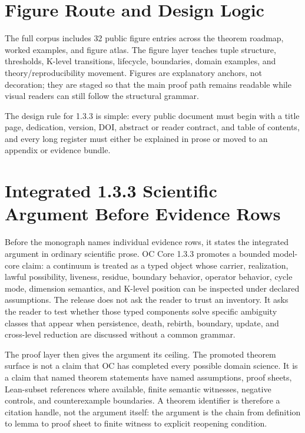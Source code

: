 \section{Figure Route and Design Logic}
\label{sec:oc133-figure-route-design-logic}
The full corpus includes 32 public figure entries across the theorem roadmap, worked examples, and figure atlas. The figure layer teaches tuple structure, thresholds, K-level transitions, lifecycle, boundaries, domain examples, and theory/reproducibility movement. Figures are explanatory anchors, not decoration; they are staged so that the main proof path remains readable while visual readers can still follow the structural grammar.

The design rule for 1.3.3 is simple: every public document must begin with a title page, dedication, version, DOI, abstract or reader contract, and table of contents, and every long register must either be explained in prose or moved to an appendix or evidence bundle.


\section{Integrated 1.3.3 Scientific Argument Before Evidence Rows}
\label{sec:oc133-integrated-argument-before-evidence-rows}
Before the monograph names individual evidence rows, it states the integrated argument in ordinary scientific prose. OC Core 1.3.3 promotes a bounded model-core claim: a continuum is treated as a typed object whose carrier, realization, lawful possibility, liveness, residue, boundary behavior, operator behavior, cycle mode, dimension semantics, and K-level position can be inspected under declared assumptions. The release does not ask the reader to trust an inventory. It asks the reader to test whether those typed components solve specific ambiguity classes that appear when persistence, death, rebirth, boundary, update, and cross-level reduction are discussed without a common grammar.

The proof layer then gives the argument its ceiling. The promoted theorem surface is not a claim that OC has completed every possible domain science. It is a claim that named theorem statements have named assumptions, proof sheets, Lean-subset references where available, finite semantic witnesses, negative controls, and counterexample boundaries. A theorem identifier is therefore a citation handle, not the argument itself: the argument is the chain from definition to lemma to proof sheet to finite witness to explicit reopening condition.

